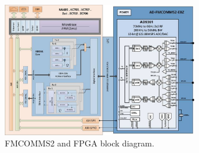 \begin{figure}[htbp]
    \centering
    \includegraphics[width=0.75\textwidth]{./figures/fmcomms2_bd}
    \caption{ FMCOMMS2 and FPGA block diagram.
    \label{fig:fmcommbd}}
\end{figure}



